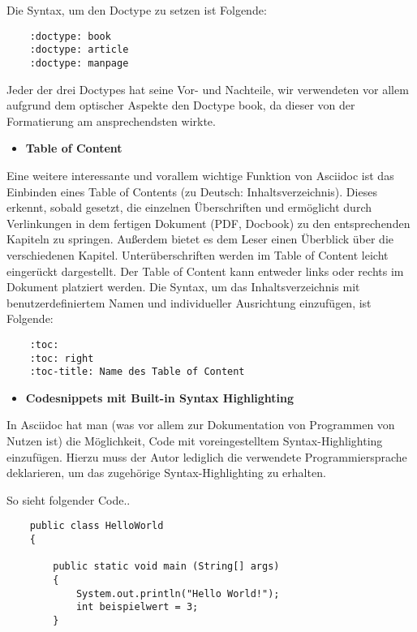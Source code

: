 \documentclass[11pt]{amsbook}
\begin{document}
Die Syntax, um den Doctype zu setzen ist Folgende:


\begin{verbatim}
    :doctype: book
    :doctype: article
    :doctype: manpage
\end{verbatim}

Jeder der drei Doctypes hat seine Vor- und Nachteile, wir verwendeten vor allem aufgrund dem optischer Aspekte den Doctype book, da dieser von der Formatierung am ansprechendsten wirkte.


\begin{itemize}

\item \textbf{Table of Content}

\end{itemize}


Eine weitere interessante und vorallem wichtige Funktion von Asciidoc ist das Einbinden eines Table of Contents (zu Deutsch: Inhaltsverzeichnis). Dieses erkennt, sobald gesetzt, die einzelnen Überschriften und ermöglicht durch Verlinkungen in dem fertigen Dokument (PDF, Docbook) zu den entsprechenden Kapiteln zu springen. Außerdem bietet es dem Leser einen Überblick über die verschiedenen Kapitel. Unterüberschriften werden im Table of Content leicht eingerückt dargestellt. Der Table of Content kann entweder links oder rechts im Dokument platziert werden.
Die Syntax, um das Inhaltsverzeichnis mit benutzerdefiniertem Namen und individueller Ausrichtung einzufügen, ist Folgende:


\begin{verbatim}
    :toc:
    :toc: right
    :toc-title: Name des Table of Content
\end{verbatim}

\begin{itemize}

\item \textbf{Codesnippets mit Built-in Syntax Highlighting}

\end{itemize}


In Asciidoc hat man (was vor allem zur Dokumentation von Programmen von Nutzen ist) die Möglichkeit, Code mit voreingestelltem Syntax-Highlighting einzufügen. Hierzu muss der Autor lediglich die verwendete Programmiersprache deklarieren, um das zugehörige Syntax-Highlighting zu erhalten.


So sieht folgender Code..


\begin{verbatim}
    public class HelloWorld
    {

        public static void main (String[] args)
        {
            System.out.println("Hello World!");
            int beispielwert = 3;
        }
\end{verbatim}
\end{document}
